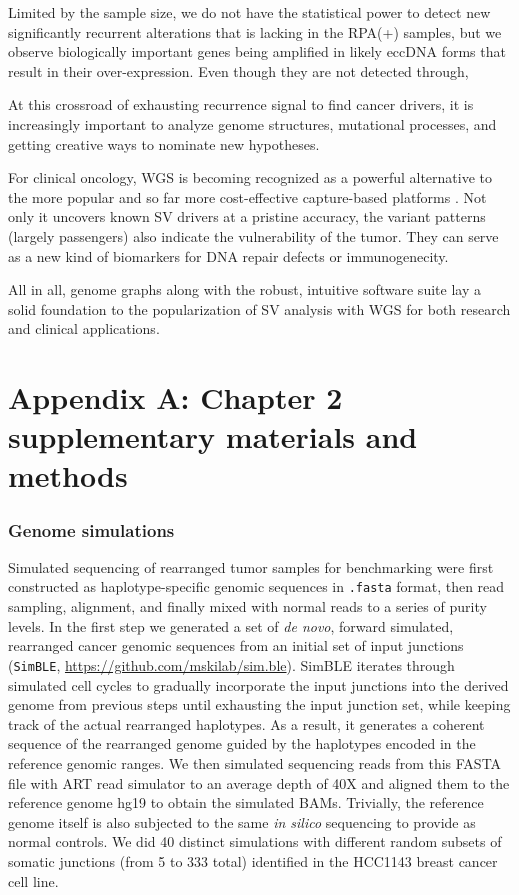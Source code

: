 \documentclass[phd,tocprelim]{cornell}
\newcommand{\ttt}[1]{\texttt{#1}}
\begin{document}
Limited by the sample size, we do not have the statistical power to detect new significantly recurrent alterations that is lacking in the RPA(+) samples, but we observe biologically important genes being amplified in likely eccDNA forms that result in their over-expression. Even though they are not detected through, 

At this crossroad of exhausting recurrence signal to find cancer drivers, it is increasingly important to analyze genome structures, mutational processes, and getting creative ways to nominate new hypotheses.

For clinical oncology, WGS is becoming recognized as a powerful alternative to the more popular and so far more cost-effective capture-based platforms \cite{Meggendorfer2021-wo}. Not only it uncovers known SV drivers at a pristine accuracy, the variant patterns (largely passengers) also indicate the vulnerability of the tumor. They can serve as a new kind of biomarkers for DNA repair defects or immunogenecity.

All in all, genome graphs along with the robust, intuitive software suite lay a solid foundation to the popularization of SV analysis with WGS for both research and clinical applications.

\appendix

\chapter*{Appendix A: Chapter 2 supplementary materials and methods} \label{app:a}
\subsection*{Genome simulations}
Simulated sequencing of rearranged tumor samples for benchmarking were first constructed as haplotype-specific genomic sequences in \ttt{.fasta} format, then read sampling, alignment, and finally mixed with normal reads to a series of purity levels. In the first step we generated a set of \textit{de novo}, forward simulated, rearranged cancer genomic sequences from an initial set of input junctions (\texttt{SimBLE}, \url{https://github.com/mskilab/sim.ble}). SimBLE iterates through simulated cell cycles to gradually incorporate the input junctions into the derived genome from previous steps until exhausting the input junction set, while keeping track of the actual rearranged haplotypes. As a result, it generates a coherent sequence of the rearranged genome guided by the haplotypes encoded in the reference genomic ranges. We then simulated sequencing reads from this FASTA file with ART read simulator \cite{Huang2012-zn} to an average depth of 40X and aligned them to the reference genome hg19 to obtain the simulated BAMs. Trivially, the reference genome itself is also subjected to the same \textit{in silico} sequencing to provide as normal controls. We did 40 distinct simulations with different random subsets of somatic junctions (from 5 to 333 total) identified in the HCC1143 breast cancer cell line. 
\end{document}
